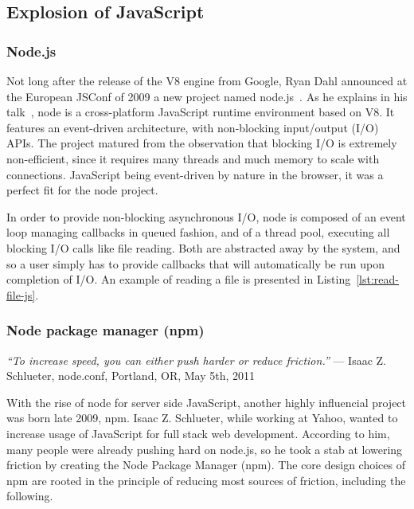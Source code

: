 \subsection{Explosion of JavaScript}%
\label{sub:explosion_of_javascript}


\subsubsection{Node.js}%
\label{ssub:node_js}

Not long after the release of the V8 engine from Google,
Ryan Dahl announced at the European JSConf of 2009
a new project named node.js~\cite{node-js-speaker}.
As he explains in his talk~\cite{node-js-video},
node is a cross-platform JavaScript runtime environment based on V8.
It features an event-driven architecture, with non-blocking input/output (I/O) APIs.
The project matured from the observation that blocking I/O is extremely non-efficient,
since it requires many threads and much memory to scale with connections.
JavaScript being event-driven by nature in the browser,
it was a perfect fit for the node project.

In order to provide non-blocking asynchronous I/O,
node is composed of an event loop managing callbacks in queued fashion,
and of a thread pool, executing all blocking I/O calls like file reading.
Both are abstracted away by the system, and so a user simply has
to provide callbacks that will automatically be run upon completion of I/O.
An example of reading a file is presented in Listing~\ref{lst:read-file-js}.




\subsubsection{Node package manager (npm)}%
\label{ssub:node_package_manager_npm_}

\begin{displayquote}
	\textit{``To increase speed, you can either push harder or reduce friction.''}
	--- Isaac Z. Schlueter, node.conf, Portland, OR, May 5th, 2011
\end{displayquote}

With the rise of node for server side JavaScript,
another highly influencial project was born late 2009, npm.
Isaac Z. Schlueter, while working at Yahoo, wanted to increase usage
of JavaScript for full stack web development.
According to him, many people were already pushing hard on node.js,
so he took a stab at lowering friction by creating the Node Package Manager (npm).
The core design choices of npm are rooted in the principle of reducing
most sources of friction, including the following.

